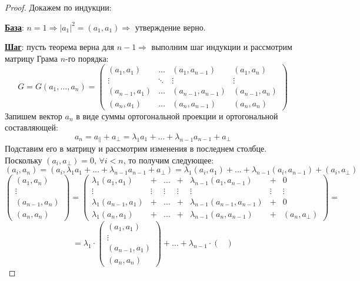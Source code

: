 \documentclass[12pt]{article}
\theoremstyle{definition}
\begin{document}
\begin{proof}
	Докажем по индукции:
	
	\uline{\textbf{База}}: $n = 1 \Rightarrow |a_1|^2 = (a_1,a_1) \Rightarrow$ утверждение верно.
	
	\uline{\textbf{Шаг}}: пусть теорема верна для $n-1 \Rightarrow$ выполним шаг индукции и рассмотрим матрицу Грама $n$-го порядка:
	$$
		G = G(a_1, \dotsc, a_n) = 
		\begin{pmatrix}
			(a_1,a_1) & \dotsc & (a_1, a_{n-1}) & (a_1, a_n) \\
			\vdots & \ddots & \vdots & \vdots \\
			(a_{n-1}, a_1) & \dotsc & (a_{n-1}, a_{n-1}) & (a_{n-1}, a_n) \\ 
			(a_n, a_1) & \dotsc & (a_{n}, a_{n-1}) & (a_n, a_n)
		\end{pmatrix}
	$$
	Запишем вектор $a_n$ в виде суммы ортогональной проекции и ортогональной составляющей:
	$$
		a_n = a_{\|} + a_{\bot} = \lambda_1 a_1 + \dotsc + \lambda_{n-1} a_{n-1} + a_\bot
	$$
	Подставим его в матрицу и рассмотрим изменения в последнем столбце. Поскольку $(a_i, a_\bot) = 0, \, \forall i < n$, то получим следующее:
	$$
		(a_i, a_n) = (a_i,  \lambda_1 a_1 + \dotsc + \lambda_{n-1} a_{n-1} + a_\bot) = \lambda_1 (a_i, a_1) + \dotsc + \lambda_{n-1}(a_i, a_{n-1}) + (a_i, a_\bot)
	$$
	$$
		\begin{pmatrix}
			(a_1, a_n)\\
			\vdots \\
			(a_{n-1}, a_n)\\
			(a_n, a_n)
		\end{pmatrix} =
		\begin{pmatrix}
			\lambda_1 (a_1, a_1) &+& \dotsc &+& \lambda_{n-1}(a_1, a_{n-1}) &+& 0 \\
			\vdots & \vdots & \vdots & \vdots & \vdots & \vdots & \vdots  \\
			\lambda_1 (a_{n-1}, a_1) &+& \dotsc &+& \lambda_{n-1}(a_{n-1}, a_{n-1}) &+& 0 \\
			\lambda_1 (a_n, a_1) &+& \dotsc &+& \lambda_{n-1}(a_n, a_{n-1}) &+& (a_n, a_\bot)
		\end{pmatrix} =
	$$
	$$
		= \lambda_1{\cdot}
		\begin{pmatrix}
			(a_1, a_1)\\
			\vdots\\
			(a_{n-1},a_1)\\
			(a_n, a_n)
		\end{pmatrix} + \dotsc + \lambda_{n-1}{\cdot}
		\begin{pmatrix}

\end{pmatrix}$$
\end{proof}
\end{document}
